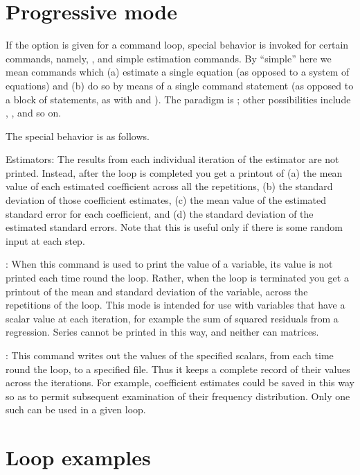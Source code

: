 \section{Progressive mode}
\label{loop-progressive}

If the  option is given for a command loop,
special behavior is invoked for certain commands, namely, ,
 and simple estimation commands.  By ``simple'' here we
mean commands which (a) estimate a single equation (as opposed to a
system of equations) and (b) do so by means of a single command
statement (as opposed to a block of statements, as with  and
).  The paradigm is ; other possibilities include
, ,  and so on.

The special behavior is as follows.

Estimators: The results from each individual iteration of the
estimator are not printed.  Instead, after the loop is completed you
get a printout of (a) the mean value of each estimated coefficient
across all the repetitions, (b) the standard deviation of those
coefficient estimates, (c) the mean value of the estimated standard
error for each coefficient, and (d) the standard deviation of the
estimated standard errors.  Note that this is useful only if there is
some random input at each step.

: When this command is used to print the value of a
variable, its value is not printed each time round the loop.  Rather,
when the loop is terminated you get a printout of the mean and
standard deviation of the variable, across the repetitions of the
loop.  This mode is intended for use with variables that have a scalar
value at each iteration, for example the sum of squared residuals from
a regression.  Series cannot be printed in this way, and neither can
matrices.

: This command writes out the values of the specified
scalars, from each time round the loop, to a specified file.  Thus it
keeps a complete record of their values across the iterations.  For
example, coefficient estimates could be saved in this way so as to
permit subsequent examination of their frequency distribution.  Only
one such  can be used in a given loop.

\section{Loop examples}
\label{loop-examples}


